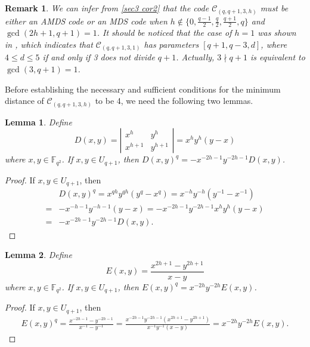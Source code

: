 \documentclass[10pt]{article}%
\newtheorem{lemma}{Lemma}
\newtheorem{remark}{Remark}%
\begin{document}
	\begin{remark}
		We can infer from \cref{sec3 cor2} that the code $\mathcal{C}_{(q,q+1,3,h)}$ must be either an AMDS code or an MDS code when $h\notin\{0,\frac{q-1}{2},\frac{q}{2},\frac{q+1}{2},q\}$ and $\gcd(2h+1,q+1)=1$. It should be noticed that the case of $h=1$ was shown in \cite{Ding2020InfiniteFamiliesMDS}, which indicates that $\mathcal{C}_{(q,q+1,3,1)}$ has parameters $[q+1,q-3,d]$, where $4\le d\le 5$ if and only if 3 does not divide $q+1$. Actually, $3\nmid q+1$ is equivalent to $\gcd(3,q+1)=1$.
	\end{remark}
	
	Before establishing the necessary and sufficient conditions for the minimum distance of $\mathcal{C}_{(q,q+1,3,h)}$ to be 4, we need the following two lemmas. 
	\begin{lemma}\label{sec3 lem5}
		Define
		\begin{equation}\label{sec3 lem5 equ1}
			D(x,y)=\left|\begin{array}{ll}
				x^h & y^h\\
				x^{h+1} & y^{h+1}
			\end{array}\right|=x^hy^h(y-x)
		\end{equation}
		where $x,y\in\mathbb{F}_{q^2}$. If $x,y\in U_{q+1}$, then $D(x,y)^q=-x^{-2h-1}y^{-2h-1}D(x,y)$.
	\end{lemma}
	\begin{proof}
		If $x,y\in U_{q+1}$, then
		\begin{equation*}
			\begin{aligned}
				&D(x,y)^q=x^{qh}y^{qh}(y^q-x^q)=x^{-h}y^{-h}(y^{-1}-x^{-1})\\
				=&-x^{-h-1}y^{-h-1}(y-x)=-x^{-2h-1}y^{-2h-1}x^hy^h(y-x)\\
				=&-x^{-2h-1}y^{-2h-1}D(x,y).
			\end{aligned}
		\end{equation*}
	\end{proof}
	
	\begin{lemma}\label{sec3 lem6}
		Define
		\begin{equation}\label{sec3 lem6 equ1}
			E(x,y)=\frac{x^{2h+1}-y^{2h+1}}{x-y}
		\end{equation}
		where $x,y\in\mathbb{F}_{q^2}$. If $x,y\in U_{q+1}$, then $E(x,y)^q=x^{-2h}y^{-2h}E(x,y)$.
	\end{lemma}
	\begin{proof}
		If $x,y\in U_{q+1}$, then
		\begin{equation*}
			\begin{aligned}
				E(x,y)^q=\frac{x^{-2h-1}-y^{-2h-1}}{x^{-1}-y^{-1}}=\frac{x^{-2h-1}y^{-2h-1}(x^{2h+1}-y^{2h+1})}{x^{-1}y^{-1}(x-y)}=x^{-2h}y^{-2h}E(x,y).
			\end{aligned}
		\end{equation*}
	\end{proof}
		
\end{document}
